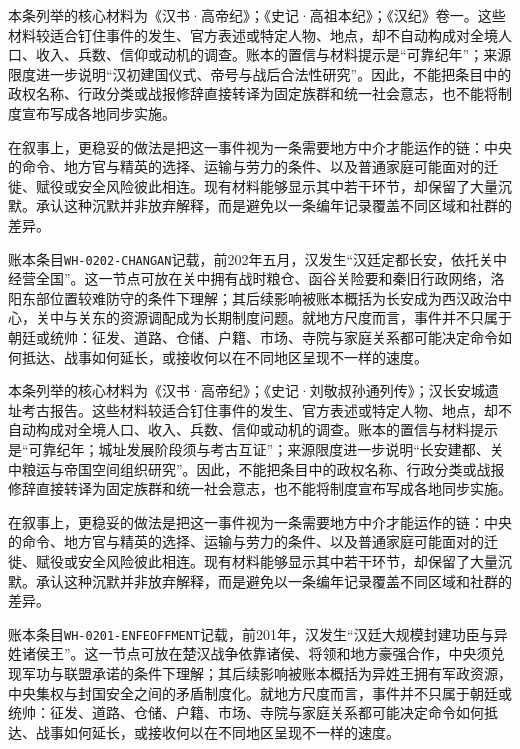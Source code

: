 本条列举的核心材料为《汉书·高帝纪》；《史记·高祖本纪》；《汉纪》卷一。这些材料较适合钉住事件的发生、官方表述或特定人物、地点，却不自动构成对全境人口、收入、兵数、信仰或动机的调查。账本的置信与材料提示是“可靠纪年”；来源限度进一步说明“汉初建国仪式、帝号与战后合法性研究”。因此，不能把条目中的政权名称、行政分类或战报修辞直接转译为固定族群和统一社会意志，也不能将制度宣布写成各地同步实施。

在叙事上，更稳妥的做法是把这一事件视为一条需要地方中介才能运作的链：中央的命令、地方官与精英的选择、运输与劳力的条件、以及普通家庭可能面对的迁徙、赋役或安全风险彼此相连。现有材料能够显示其中若干环节，却保留了大量沉默。承认这种沉默并非放弃解释，而是避免以一条编年记录覆盖不同区域和社群的差异。

账本条目\texttt{WH-0202-CHANGAN}记载，前202年五月，汉发生“汉廷定都长安，依托关中经营全国”。这一节点可放在关中拥有战时粮仓、函谷关险要和秦旧行政网络，洛阳东部位置较难防守的条件下理解；其后续影响被账本概括为长安成为西汉政治中心，关中与关东的资源调配成为长期制度问题。就地方尺度而言，事件并不只属于朝廷或统帅：征发、道路、仓储、户籍、市场、寺院与家庭关系都可能决定命令如何抵达、战事如何延长，或接收何以在不同地区呈现不一样的速度。

本条列举的核心材料为《汉书·高帝纪》；《史记·刘敬叔孙通列传》；汉长安城遗址考古报告。这些材料较适合钉住事件的发生、官方表述或特定人物、地点，却不自动构成对全境人口、收入、兵数、信仰或动机的调查。账本的置信与材料提示是“可靠纪年；城址发展阶段须与考古互证”；来源限度进一步说明“长安建都、关中粮运与帝国空间组织研究”。因此，不能把条目中的政权名称、行政分类或战报修辞直接转译为固定族群和统一社会意志，也不能将制度宣布写成各地同步实施。

在叙事上，更稳妥的做法是把这一事件视为一条需要地方中介才能运作的链：中央的命令、地方官与精英的选择、运输与劳力的条件、以及普通家庭可能面对的迁徙、赋役或安全风险彼此相连。现有材料能够显示其中若干环节，却保留了大量沉默。承认这种沉默并非放弃解释，而是避免以一条编年记录覆盖不同区域和社群的差异。

账本条目\texttt{WH-0201-ENFEOFFMENT}记载，前201年，汉发生“汉廷大规模封建功臣与异姓诸侯王”。这一节点可放在楚汉战争依靠诸侯、将领和地方豪强合作，中央须兑现军功与联盟承诺的条件下理解；其后续影响被账本概括为异姓王拥有军政资源，中央集权与封国安全之间的矛盾制度化。就地方尺度而言，事件并不只属于朝廷或统帅：征发、道路、仓储、户籍、市场、寺院与家庭关系都可能决定命令如何抵达、战事如何延长，或接收何以在不同地区呈现不一样的速度。

